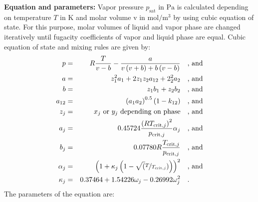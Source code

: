 \textbf{Equation and parameters:}
\newline
%
Vapor pressure $p_\mathrm{sat}$ in $\si{\pascal}$ is calculated depending on temperature $T$ in $\si{\kelvin}$ and molar volume v in $\si{\mole\per\cubic\meter}$ by using cubic equation of state. For this purpose, molar volumes of liquid and vapor phase are changed iteratively until fugacity coefficients of vapor and liquid phase are equal. Cubic equation of state and mixing rules are given by:
\begin{equation*}
\begin{split}
p &=& R \frac{T}{v - b} - \frac{a}{v \left(v + b\right) + b \left(v - b\right)} & \quad\text{, and} \\
a &=& z_1^2 a_1 + 2 z_1 z_2 a_{12} + 2_2^2 a_2 & \quad\text{, and} \\
b &=& z_1 b_1 + z_2 b_2 & \quad\text{, and} \\
a_{12} &=& \left( a_1 a_2 \right) ^{0.5} \left(1 - k_{12} \right) & \quad\text{, and} \\
z_j &=& x_j \textrm { or } y_j \textrm{ depending on phase} & \quad\text{, and} \\
a_j &=& 0.45724 \frac{\left(R T_{\mathrm{crit},j} \right)^2}{p_{\mathrm{crit},j}} \alpha_j & \quad\text{, and} \\
b_j &=& 0.07780 R \frac{T_{\mathrm{crit},j}}{p_{\mathrm{crit},j}} & \quad\text{, and} \\
\alpha_j &=& \left(1 + \kappa_j \left(1 - \sqrt(\nicefrac{T}{T_{\mathrm{crit},j}}) \right) \right)^2 & \quad\text{, and} \\
\kappa_j &=& 0.37464 + 1.54226 \omega_j - 0.26992 \omega_j^2 & \quad\text{.}
\end{split}
\end{equation*}
%
The parameters of the equation are:
%
